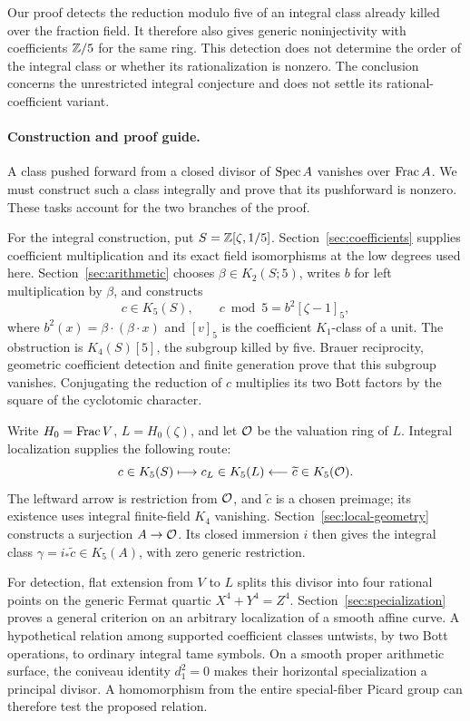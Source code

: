 Our proof detects the reduction modulo five of an integral class already
killed over the fraction field. It therefore also gives generic
noninjectivity with coefficients $\mathbb Z/5$ for the same ring. This detection
does not determine the order of the integral class or whether its
rationalization is nonzero. The conclusion concerns the unrestricted
integral conjecture and does not settle its rational-coefficient variant.

\paragraph{Construction and proof guide.}
A class pushed forward from a closed divisor of $\operatorname{Spec} A$ vanishes over
$\operatorname{Frac} A$. We must construct such a class integrally and prove that its
pushforward is nonzero. These tasks account for the two branches of the
proof.

For the integral construction, put $S=\mathbb Z[\zeta,1/5]$.
Section~\ref{sec:coefficients} supplies coefficient multiplication and
its exact field isomorphisms at the low degrees used here.
Section~\ref{sec:arithmetic} chooses $\beta\in K_2(S;5)$, writes $b$
for left multiplication by $\beta$, and constructs
\[
 c\in K_5(S),\qquad c\bmod5=b^2[\zeta-1]_5,
\]
where $b^2(x)=\beta\cdot(\beta\cdot x)$ and $[v]_5$ is the coefficient
$K_1$-class of a unit. The obstruction
is $K_4(S)[5]$, the subgroup killed by five. Brauer reciprocity, geometric
coefficient detection and finite generation prove that this subgroup
vanishes. Conjugating the reduction of $c$ multiplies its two Bott
factors by the square of the cyclotomic character.

Write $H_0=\operatorname{Frac} V$, $L=H_0(\zeta)$, and let $\mathcal O$ be the valuation
ring of $L$. Integral localization supplies the following route:
\[
 c\in K_5(S)\longmapsto c_L\in K_5(L)
 \longleftarrow\widetilde c\in K_5(\mathcal O).
\]
The leftward arrow is restriction from $\mathcal O$, and $\widetilde c$ is a
chosen preimage; its existence uses integral finite-field $K_4$ vanishing.
Section~\ref{sec:local-geometry} constructs a surjection $A\to\mathcal O$.
Its closed immersion $i$ then gives the integral class
$\gamma=i_*\widetilde c\in K_5(A)$, with zero generic restriction.

For detection, flat extension from $V$ to $L$ splits this divisor into
four rational points on the generic Fermat quartic $X^4+Y^4=Z^4$.
Section~\ref{sec:specialization} proves a general criterion on an arbitrary
localization of a smooth affine curve. A hypothetical relation among
supported coefficient classes untwists, by two Bott operations, to
ordinary integral tame symbols. On a smooth proper arithmetic surface,
the coniveau identity $d_1^2=0$ makes their horizontal specialization a
principal divisor. A homomorphism from the entire special-fiber Picard
group can therefore test the proposed relation.

